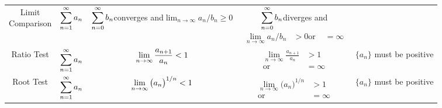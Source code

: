 \begin{center}
\begin{tabular}{ccccc}
\parbox[t]{.7in}{\centering Limit\\Comparison} & $\displaystyle\sum_{n=1}^\infty a_n$ & \parbox[t]{1.3in}{\centering$\displaystyle\sum_{n=0}^\infty b_n $\smallskip\\converges and\smallskip\\$\displaystyle \lim_{n\to\infty} a_n/b_n \geq 0$}
& \parbox[t]{1in}{\centering$\displaystyle\sum_{n=0}^\infty b_n $\smallskip\\diverges and\begin{align*}\lim_{n\to\infty} a_n/b_n &> 0\\\text{or }&=\infty\end{align*}} \\

Ratio Test & $\displaystyle\sum_{n=1}^\infty a_n$ & \parbox{1in}{\centering$\displaystyle\lim_{n\to\infty} \frac{a_{n+1}}{a_n}  < 1$}
& \parbox{1in}{\begin{align*}\lim_{n\to\infty} \frac{a_{n+1}}{a_n} &> 1\\\text{or } &=\infty\end{align*}} & 
\parbox{1in}{\centering $\{a_n\}$ must be positive}\\

Root Test & $\displaystyle\sum_{n=1}^\infty a_n$ & \parbox{1in}{\centering$\displaystyle\lim_{n\to\infty} \big(a_n\big)^{1/n} < 1$}
& \parbox{1.2in}{\begin{align*}\lim_{n\to\infty} \big(a_n\big)^{1/n} &> 1\\\text{or } &=\infty\end{align*}} & 
\parbox{1in}{\centering $\{a_n\}$ must be positive}\\\bottomrule

\end{tabular}

\end{center}

